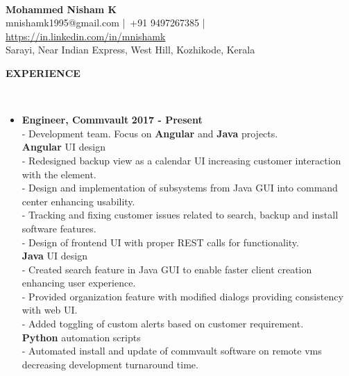 \documentclass[a4paper,10pt]{article}
\newcommand{\lsep}{-0.5cm}
\newcommand{\resheading}[1]{{\small \colorbox{mygrey}{\begin{minipage}{0.975\textwidth}{\textbf{\uppercase{#1} \vphantom{p\^{E}}}}\end{minipage}}}}
\newcommand{\when}[1]{\hfill \textbf{#1}}
\newenvironment{noSepItemize}
{ \begin{itemize}
    \setlength{\itemsep}{1pt}
    \setlength{\parskip}{0pt}
    \setlength{\parsep}{0pt}     }
{ \end{itemize}                  }
\begin{document}
\hspace{0.5cm}\\[-0.2cm]

\begin{center}
\textbf{\Large{Mohammed Nisham K}} \\
mnishamk1995@gmail.com |\, +91 9497267385 |\, \href{https://in.linkedin.com/in/mnishamk}{https://in.linkedin.com/in/mnishamk}\\
Sarayi, Near Indian Express, West Hill, Kozhikode, Kerala \\
\end{center}

\resheading{\textbf{Experience} }\\[\lsep]
\begin{noSepItemize}
\item \noindent \textbf{Engineer, Commvault} \when{2017 - Present}
	\\ \indent - Development team. Focus on \textbf{Angular} and \textbf{Java} projects.
	\\ \indent \textbf{Angular} UI design
	\\ \indent \indent - Redesigned backup view as a calendar UI increasing customer interaction with the element.
	\\ \indent \indent - Design and implementation of subsystems from Java GUI into command center enhancing usability.
	\\ \indent \indent - Tracking and fixing customer issues related to search, backup and install software features.
	\\ \indent \indent - Design of frontend UI with proper REST calls for functionality.
	\\ \indent \textbf{Java} UI design
	\\ \indent \indent - Created search feature in Java GUI to enable faster client creation enhancing user experience.
	\\ \indent \indent - Provided organization feature with modified dialogs providing consistency with web UI.
	\\ \indent \indent - Added toggling of custom alerts based on customer requirement.
	\\ \indent \textbf{Python} automation scripts
	\\ \indent \indent - Automated install and update of commvault software on remote vms decreasing development turnaround time. 

\end{noSepItemize}
\end{document}
